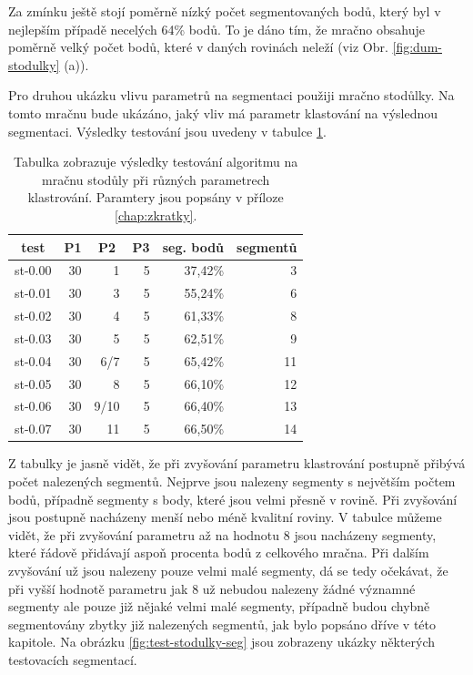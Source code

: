 \documentclass[11pt,twoside,a4paper]{book}
\begin{document}
Za zmínku ještě stojí poměrně nízký počet segmentovaných bodů, který byl v nejlepším případě necelých 64\% bodů. To je dáno tím, že mračno obsahuje poměrně velký počet bodů, které v daných rovinách neleží (viz Obr. \ref{fig:dum-stodulky} (a)).

Pro druhou ukázku vlivu parametrů na segmentaci použiji mračno stodůlky. Na tomto mračnu bude ukázáno, jaký vliv má parametr klastování na výslednou segmentaci. Výsledky testování jsou uvedeny v tabulce \ref{table:test3-klastr}.

\begin{table}[ht]
\begin{center}
\begin{tabular}{|r|r|r|r|r|r|}
\hline
\multicolumn{1}{|c|}{\textbf{test}} & \multicolumn{1}{c|}{\textbf{P1}} & \multicolumn{1}{c|}{\textbf{P2}} & \multicolumn{1}{c|}{\textbf{P3}} & \multicolumn{1}{c|}{\textbf{seg. bodů}} & \multicolumn{1}{c|}{\textbf{segmentů}} \\ \hline
st-0.00 & 30 & 1 & 5 & 37,42\% & 3 \\ \hline
st-0.01 & 30 & 3 & 5 & 55,24\% & 6 \\ \hline
st-0.02 & 30 & 4 & 5 & 61,33\% & 8 \\ \hline
st-0.03 & 30 & 5 & 5 & 62,51\% & 9 \\ \hline
st-0.04 & 30 & 6/7 & 5 & 65,42\% & 11 \\ \hline
st-0.05 & 30 & 8 & 5 & 66,10\% & 12 \\ \hline
st-0.06 & 30 & 9/10 & 5 & 66,40\% & 13 \\ \hline
st-0.07 & 30 & 11 & 5 & 66,50\% & 14 \\ \hline
\end{tabular}
\caption{Tabulka zobrazuje výsledky testování algoritmu na mračnu stodůly při různých parametrech klastrování. Paramtery jsou popsány v příloze \ref{chap:zkratky}.} 
\label{table:test3-klastr}
\end{center}
\end{table}

Z tabulky je jasně vidět, že při zvyšování parametru klastrování postupně přibývá počet nalezených segmentů. Nejprve jsou nalezeny segmenty s největším počtem bodů, případně segmenty s body, které jsou velmi přesně v rovině. Při zvyšování jsou postupně nacházeny menší nebo méně kvalitní roviny. V tabulce můžeme vidět, že při zvyšování parametru až na hodnotu 8 jsou nacházeny segmenty, které řádově přidávají aspoň procenta bodů z celkového mračna. Při dalším zvyšování už jsou nalezeny pouze velmi malé segmenty, dá se tedy očekávat, že při vyšší hodnotě parametru jak 8 už nebudou nalezeny žádné významné segmenty ale pouze již nějaké velmi malé segmenty, případně budou chybně segmentovány zbytky již nalezených segmentů, jak bylo popsáno dříve v této kapitole. Na obrázku \ref{fig:test-stodulky-seg} jsou zobrazeny ukázky některých testovacích segmentací.
\end{document}
